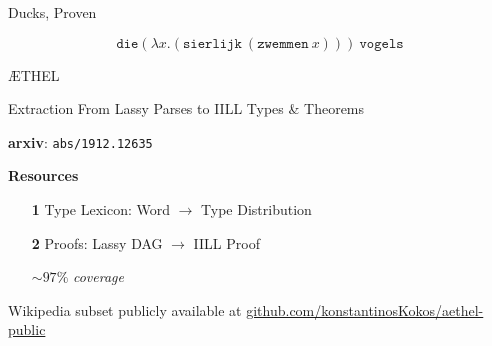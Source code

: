 \documentclass{beamer}
\begin{document}
\begin{frame}{Ducks, Proven}
	\tiny

		\vfill
		
\[
	\texttt{die}\left(\lambda x.\left(\texttt{sierlijk} \ \left(\texttt{zwemmen} \ x\right)\right)\right) \ \texttt{vogels}
\]
\end{frame}

\begin{frame}{\AE THEL}

	\begin{block}{Extraction}
	From Lassy Parses to IILL Types \& Theorems
	\begin{flushright}
	\textbf{arxiv}: \quad \texttt{abs/1912.12635}
	\end{flushright}
	\end{block}
	\vfill

	\textbf{Resources}	
	\begin{itemize}
	\item[\textbf{1}] Type Lexicon: Word $\to$ Type Distribution
	\item[\textbf{2}] Proofs: Lassy DAG $\to$ IILL Proof
	\begin{flushright}
			$\sim97\%$ \textit{coverage}
	\end{flushright}
	\end{itemize}
	
	\small{
	Wikipedia subset publicly available at
	\url{github.com/konstantinosKokos/aethel-public}}
		
\end{frame}
\end{document}
